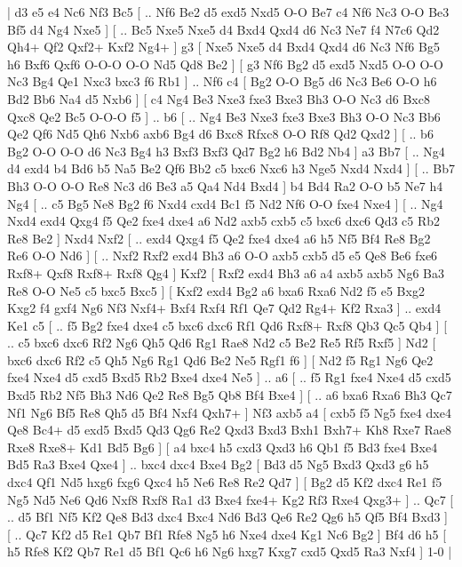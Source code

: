 \makegametitle 
|   d3   e5    e4   Nc6    Nf3   Bc5 [ .. Nf6  Be2 d5  exd5 Nxd5  O-O Be7  c4 Nf6  Nc3 O-O  Be3 Bf5  d4 Ng4  Nxe5   ]  [ .. Bc5  Nxe5 Nxe5  d4 Bxd4  Qxd4 d6  Nc3 Ne7  f4 N7c6  Qd2 Qh4+  Qf2 Qxf2+  Kxf2 Ng4+   ]  g3 [  Nxe5 Nxe5  d4 Bxd4  Qxd4 d6  Nc3 Nf6  Bg5 h6  Bxf6 Qxf6  O-O-O O-O  Nd5 Qd8  Be2   ]  [  g3 Nf6  Bg2 d5  exd5 Nxd5  O-O O-O  Nc3 Bg4  Qe1 Nxc3  bxc3 f6  Rb1   ] .. Nf6    c4 [  Bg2 O-O  Bg5 d6  Nc3 Be6  O-O h6  Bd2 Bb6  Na4 d5  Nxb6   ]  [  c4 Ng4  Be3 Nxe3  fxe3 Bxe3  Bh3 O-O  Nc3 d6  Bxc8 Qxc8  Qe2 Bc5  O-O-O f5   ] .. b6 [ .. Ng4  Be3 Nxe3  fxe3 Bxe3  Bh3 O-O  Nc3 Bb6  Qe2 Qf6  Nd5 Qh6  Nxb6 axb6  Bg4 d6  Bxc8 Rfxc8  O-O Rf8  Qd2 Qxd2   ]  [ .. b6  Bg2 O-O  O-O d6  Nc3 Bg4  h3 Bxf3  Bxf3 Qd7  Bg2 h6  Bd2 Nb4   ]  a3   Bb7 [ .. Ng4  d4 exd4  b4 Bd6  b5 Na5  Be2 Qf6  Bb2 c5  bxc6 Nxc6  h3 Nge5  Nxd4 Nxd4   ]  [ .. Bb7  Bh3 O-O  O-O Re8  Nc3 d6  Be3 a5  Qa4 Nd4  Bxd4   ]  b4   Bd4    Ra2   O-O    b5   Ne7    h4   Ng4 [ .. c5  Bg5 Ne8  Bg2 f6  Nxd4 cxd4  Bc1 f5  Nd2 Nf6  O-O fxe4  Nxe4   ]  [ .. Ng4  Nxd4 exd4  Qxg4 f5  Qe2 fxe4  dxe4 a6  Nd2 axb5  cxb5 c5  bxc6 dxc6  Qd3 c5  Rb2 Re8  Be2   ]  Nxd4   Nxf2 [ .. exd4  Qxg4 f5  Qe2 fxe4  dxe4 a6  h5 Nf5  Bf4 Re8  Bg2 Re6  O-O Nd6   ]  [ .. Nxf2  Rxf2 exd4  Bh3 a6  O-O axb5  cxb5 d5  e5 Qe8  Be6 fxe6  Rxf8+ Qxf8  Rxf8+ Rxf8  Qg4   ]  Kxf2 [  Rxf2 exd4  Bh3 a6  a4 axb5  axb5 Ng6  Ba3 Re8  O-O Ne5  c5 bxc5  Bxc5   ]  [  Kxf2 exd4  Bg2 a6  bxa6 Rxa6  Nd2 f5  e5 Bxg2  Kxg2 f4  gxf4 Ng6  Nf3 Nxf4+  Bxf4 Rxf4  Rf1 Qe7  Qd2 Rg4+  Kf2 Rxa3   ] .. exd4    Ke1   c5 [ .. f5  Bg2 fxe4  dxe4 c5  bxc6 dxc6  Rf1 Qd6  Rxf8+ Rxf8  Qb3 Qc5  Qb4   ]  [ .. c5  bxc6 dxc6  Rf2 Ng6  Qh5 Qd6  Rg1 Rae8  Nd2 c5  Be2 Re5  Rf5 Rxf5   ]  Nd2 [  bxc6 dxc6  Rf2 c5  Qh5 Ng6  Rg1 Qd6  Be2 Ne5  Rgf1 f6   ]  [  Nd2 f5  Rg1 Ng6  Qe2 fxe4  Nxe4 d5  cxd5 Bxd5  Rb2 Bxe4  dxe4 Ne5   ] .. a6 [ .. f5  Rg1 fxe4  Nxe4 d5  cxd5 Bxd5  Rb2 Nf5  Bh3 Nd6  Qe2 Re8  Bg5 Qb8  Bf4 Bxe4   ]  [ .. a6  bxa6 Rxa6  Bh3 Qc7  Nf1 Ng6  Bf5 Re8  Qh5 d5  Bf4 Nxf4  Qxh7+   ]  Nf3   axb5    a4 [  cxb5 f5  Ng5 fxe4  dxe4 Qe8  Bc4+ d5  exd5 Bxd5  Qd3 Qg6  Re2 Qxd3  Bxd3 Bxh1  Bxh7+ Kh8  Rxe7 Rae8  Rxe8 Rxe8+  Kd1 Bd5  Bg6   ]  [  a4 bxc4  h5 cxd3  Qxd3 h6  Qb1 f5  Bd3 fxe4  Bxe4 Bd5  Ra3 Bxe4  Qxe4   ] .. bxc4    dxc4   Bxe4    Bg2 [  Bd3 d5  Ng5 Bxd3  Qxd3 g6  h5 dxc4  Qf1 Nd5  hxg6 fxg6  Qxc4 h5  Ne6 Re8  Re2 Qd7   ]  [  Bg2 d5  Kf2 dxc4  Re1 f5  Ng5 Nd5  Ne6 Qd6  Nxf8 Rxf8  Ra1 d3  Bxe4 fxe4+  Kg2 Rf3  Rxe4 Qxg3+   ] .. Qc7 [ .. d5  Bf1 Nf5  Kf2 Qe8  Bd3 dxc4  Bxc4 Nd6  Bd3 Qe6  Re2 Qg6  h5 Qf5  Bf4 Bxd3   ]  [ .. Qc7  Kf2 d5  Re1 Qb7  Bf1 Rfe8  Ng5 h6  Nxe4 dxe4  Kg1 Nc6  Bg2   ]  Bf4   d6    h5    [  h5 Rfe8  Kf2 Qb7  Re1 d5  Bf1 Qc6  h6 Ng6  hxg7 Kxg7  cxd5 Qxd5  Ra3 Nxf4   ] 1-0  |
